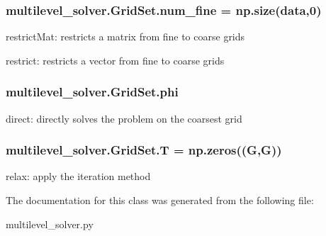 \subsubsection[{num\+\_\+fine}]{\setlength{\rightskip}{0pt plus 5cm}multilevel\+\_\+solver.\+Grid\+Set.\+num\+\_\+fine = np.\+size(data,0)\hspace{0.3cm}{\ttfamily [static]}}\label{classmultilevel__solver_1_1_grid_set_aab6805fdddd81cb0bff39c74a1db5ebd}
\begin{DoxyVerb}restrictMat: restricts a matrix from fine to coarse grids\end{DoxyVerb}


\begin{DoxyVerb}restrict: restricts a vector from fine to coarse grids\end{DoxyVerb}
\subsubsection[{phi}]{\setlength{\rightskip}{0pt plus 5cm}multilevel\+\_\+solver.\+Grid\+Set.\+phi\hspace{0.3cm}{\ttfamily [static]}}\label{classmultilevel__solver_1_1_grid_set_a89f4924177047261d47c0a17403fb4f7}
\begin{DoxyVerb}direct: directly solves the problem on the coarsest grid\end{DoxyVerb}
\subsubsection[{T}]{\setlength{\rightskip}{0pt plus 5cm}multilevel\+\_\+solver.\+Grid\+Set.\+T = np.\+zeros((G,G))\hspace{0.3cm}{\ttfamily [static]}}\label{classmultilevel__solver_1_1_grid_set_aa463b40444b917ad445277651a853295}
\begin{DoxyVerb}relax: apply the iteration method\end{DoxyVerb}
 

The documentation for this class was generated from the following file\+:\begin{DoxyCompactItemize}
\item 
multilevel\+\_\+solver.\+py\end{DoxyCompactItemize}
